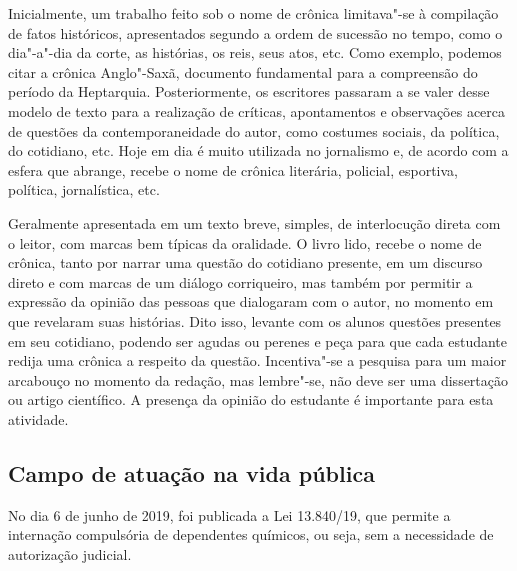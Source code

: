 \documentclass[12pt]{extarticle}
\begin{document}
Inicialmente, um trabalho feito sob o nome de crônica limitava"-se à
compilação de fatos históricos, apresentados segundo a ordem de
sucessão no tempo, como o dia"-a"-dia da corte, as histórias, os reis,
seus atos, etc. Como exemplo, podemos citar a crônica Anglo"-Saxã,
documento fundamental para a compreensão do período da Heptarquia.
Posteriormente, os escritores passaram a se valer desse modelo de
texto para a realização de críticas, apontamentos e observações acerca
de questões da contemporaneidade do autor, como costumes sociais, da
política, do cotidiano, etc. Hoje em dia é muito utilizada no
jornalismo e, de acordo com a esfera que abrange, recebe o nome de
crônica literária, policial, esportiva, política, jornalística, etc.

Geralmente apresentada em um texto breve, simples, de interlocução
direta com o leitor, com marcas bem típicas da oralidade. O livro lido,
recebe o nome de crônica, tanto por narrar uma questão do cotidiano
presente, em um discurso direto e com marcas de um diálogo corriqueiro,
mas também por permitir a expressão da opinião das pessoas que
dialogaram com o autor, no momento em que revelaram suas histórias. Dito
isso, levante com os alunos questões presentes em seu cotidiano, podendo
ser agudas ou perenes e peça para que cada estudante redija uma crônica
a respeito da questão. Incentiva"-se a pesquisa para um maior arcabouço
no momento da redação, mas lembre"-se, não deve ser uma dissertação ou
artigo científico. A presença da opinião do estudante é importante para
esta atividade.


\subsection{Campo de atuação na vida pública}



No dia 6 de junho de 2019, foi publicada a Lei 13.840/19, que permite
a internação compulsória de dependentes químicos, ou seja, sem a
necessidade de autorização judicial.
\end{document}
